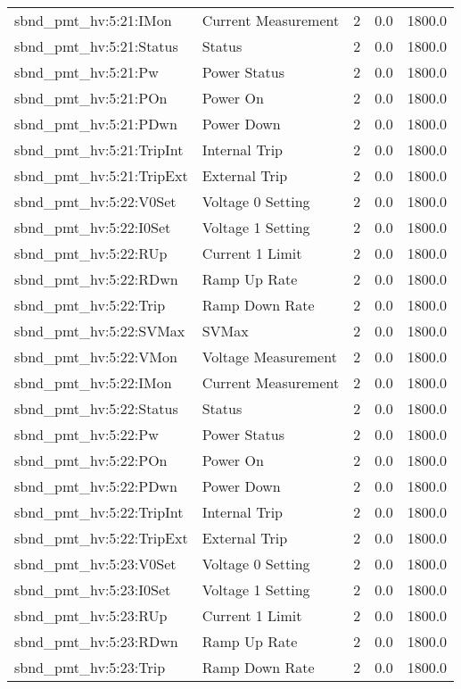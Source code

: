 \begin{center}
\begin{longtable}{l | l l l l }
sbnd\_pmt\_hv:5:21:IMon & Current Measurement & 2 & 0.0 & 1800.0\\ 
sbnd\_pmt\_hv:5:21:Status & Status & 2 & 0.0 & 1800.0\\ 
sbnd\_pmt\_hv:5:21:Pw & Power Status & 2 & 0.0 & 1800.0\\ 
sbnd\_pmt\_hv:5:21:POn & Power On & 2 & 0.0 & 1800.0\\ 
sbnd\_pmt\_hv:5:21:PDwn & Power Down & 2 & 0.0 & 1800.0\\ 
sbnd\_pmt\_hv:5:21:TripInt & Internal Trip & 2 & 0.0 & 1800.0\\ 
sbnd\_pmt\_hv:5:21:TripExt & External Trip & 2 & 0.0 & 1800.0\\ 
sbnd\_pmt\_hv:5:22:V0Set & Voltage 0 Setting & 2 & 0.0 & 1800.0\\ 
sbnd\_pmt\_hv:5:22:I0Set & Voltage 1 Setting & 2 & 0.0 & 1800.0\\ 
sbnd\_pmt\_hv:5:22:RUp & Current 1 Limit & 2 & 0.0 & 1800.0\\ 
sbnd\_pmt\_hv:5:22:RDwn & Ramp Up Rate & 2 & 0.0 & 1800.0\\ 
sbnd\_pmt\_hv:5:22:Trip & Ramp Down Rate & 2 & 0.0 & 1800.0\\ 
sbnd\_pmt\_hv:5:22:SVMax & SVMax & 2 & 0.0 & 1800.0\\ 
sbnd\_pmt\_hv:5:22:VMon & Voltage Measurement & 2 & 0.0 & 1800.0\\ 
sbnd\_pmt\_hv:5:22:IMon & Current Measurement & 2 & 0.0 & 1800.0\\ 
sbnd\_pmt\_hv:5:22:Status & Status & 2 & 0.0 & 1800.0\\ 
sbnd\_pmt\_hv:5:22:Pw & Power Status & 2 & 0.0 & 1800.0\\ 
sbnd\_pmt\_hv:5:22:POn & Power On & 2 & 0.0 & 1800.0\\ 
sbnd\_pmt\_hv:5:22:PDwn & Power Down & 2 & 0.0 & 1800.0\\ 
sbnd\_pmt\_hv:5:22:TripInt & Internal Trip & 2 & 0.0 & 1800.0\\ 
sbnd\_pmt\_hv:5:22:TripExt & External Trip & 2 & 0.0 & 1800.0\\ 
sbnd\_pmt\_hv:5:23:V0Set & Voltage 0 Setting & 2 & 0.0 & 1800.0\\ 
sbnd\_pmt\_hv:5:23:I0Set & Voltage 1 Setting & 2 & 0.0 & 1800.0\\ 
sbnd\_pmt\_hv:5:23:RUp & Current 1 Limit & 2 & 0.0 & 1800.0\\ 
sbnd\_pmt\_hv:5:23:RDwn & Ramp Up Rate & 2 & 0.0 & 1800.0\\ 
sbnd\_pmt\_hv:5:23:Trip & Ramp Down Rate & 2 & 0.0 & 1800.0\\ 

\end{longtable}
\end{center}
